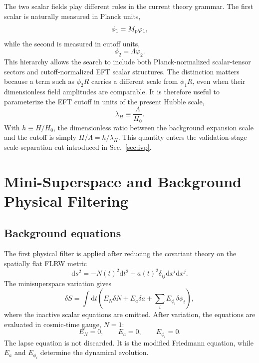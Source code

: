 \documentclass[aps,prd,twocolumn,superscriptaddress,nofootinbib,longbibliography]{revtex4-2}
\newcommand{\dd}{\mathrm{d}}
\newcommand{\Mp}{M_{\rm p}}
\newcommand{\Lam}{\Lambda}
\newcommand{\varphione}{\varphi_1}
\newcommand{\varphitwo}{\varphi_2}
\begin{document}
The two scalar fields play different roles in the current theory grammar.  The first scalar is naturally measured in Planck units,
\begin{equation}
\phi_1=\Mp\varphione,
\end{equation}
while the second is measured in cutoff units,
\begin{equation}
\phi_2=\Lam\varphitwo .
\end{equation}
This hierarchy allows the search to include both Planck-normalized scalar-tensor sectors and cutoff-normalized EFT scalar structures.  The distinction matters because a term such as $\phi_2 R$ carries a different scale from $\phi_1 R$, even when their dimensionless field amplitudes are comparable.  It is therefore useful to parameterize the EFT cutoff in units of the present Hubble scale,
\begin{equation}
\lambda_H\equiv\frac{\Lam}{H_0}.
\label{eq:lambdaH}
\end{equation}
With $h\equiv H/H_0$, the dimensionless ratio between the background expansion scale and the cutoff is simply $H/\Lam=h/\lambda_H$.  This quantity enters the validation-stage scale-separation cut introduced in Sec.~\ref{sec:ivp}.

\section{Mini-Superspace and Background Physical Filtering}
\label{sec:ghost}

\subsection{Background equations}
\label{subsec:background-eom}

The first physical filter is applied after reducing the covariant theory on the spatially flat FLRW metric
\begin{equation}
\dd s^2=-N(t)^2\dd t^2+a(t)^2\delta_{ij}\dd x^i\dd x^j .
\label{eq:flrw}
\end{equation}
The minisuperspace variation gives
\begin{equation}
\delta S=\int \dd t\left(E_N\delta N+E_a\delta a+\sum_iE_{\phi_i}\delta\phi_i\right),
\label{eq:variation}
\end{equation}
where the inactive scalar equations are omitted.  After variation, the equations are evaluated in cosmic-time gauge, $N=1$:
\begin{equation}
E_N=0,\qquad E_a=0,\qquad E_{\phi_i}=0 .
\label{eq:eom-set}
\end{equation}
The lapse equation is not discarded.  It is the modified Friedmann equation, while $E_a$ and $E_{\phi_i}$ determine the dynamical evolution.
\end{document}
